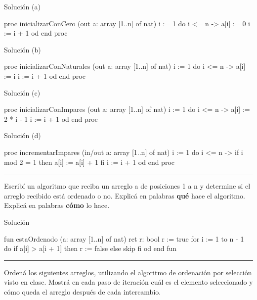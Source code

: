\begin{codebox}{Solución (a)}
\begin{pascallike}
proc inicializarConCero (out a: array [1..n] of nat)
    i := 1
    do i <= n -> 
    a[i] := 0
    i := i + 1
    od
end proc
\end{pascallike}
\end{codebox}
\begin{codebox}{Solución (b)}
\begin{pascallike}
proc inicializarConNaturales (out a: array [1..n] of nat)
    i := 1
    do i <= n -> 
    a[i] := i
    i := i + 1
    od
end proc
\end{pascallike}
\end{codebox}
\begin{codebox}{Solución (c)}
\begin{pascallike}
proc inicializarConImpares (out a: array [1..n] of nat)
    i := 1
    do i <= n -> 
    a[i] := 2 * i - 1
    i := i + 1
    od
end proc
\end{pascallike}
\end{codebox}
\begin{codebox}{Solución (d)}
\begin{pascallike}
proc incrementarImpares (in/out a: array [1..n] of nat)
    i := 1
    do i <= n -> 
    if i mod 2 = 1 then
        a[i] := a[i] + 1
    fi
    i := i + 1
    od
end proc
\end{pascallike}
\end{codebox}

\begin{center}
    \rule{\textwidth}{0.4pt}
\end{center}

Escribí un algoritmo que reciba un arreglo a de posiciones 1 a n y determine si el arreglo recibido está ordenado o no. Explicá en palabras \textbf{qué} hace el algoritmo. Explicá en palabras \textbf{cómo} lo hace.

\begin{codebox}{Solución}
\begin{pascallike}
fun estaOrdenado (a: array [1..n] of nat) ret r: bool
    r := true
    for i := 1 to n - 1 do
    if a[i] > a[i + 1] then
        r := false
    else
        skip
    fi
    od
end fun
\end{pascallike}
\end{codebox}

\begin{center}
    \rule{\textwidth}{0.4pt}
\end{center}
\newpage
Ordená los siguientes arreglos, utilizando el algoritmo de ordenación por selección visto en clase. Mostrá en cada paso de iteración cuál es el elemento seleccionado y cómo queda el arreglo después de cada intercambio.

